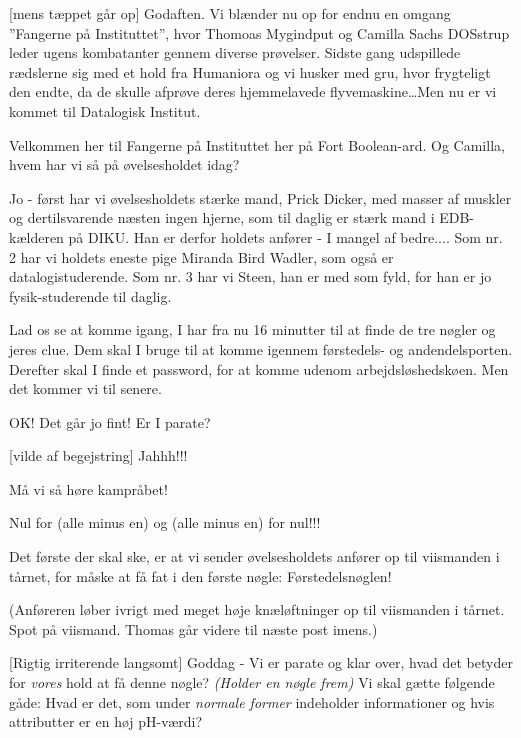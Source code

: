 \documentclass{article}
\begin{document}
\begin{sketch}

[mens tæppet går op] Godaften. Vi blænder nu op for endnu en
  omgang ''Fangerne på Instituttet'', hvor Thomoas Mygindput og Camilla
  Sachs DOSstrup leder ugens kombatanter gennem diverse prøvelser. Sidste
  gang udspillede rædslerne sig med et hold fra Humaniora og vi husker med
  gru, hvor frygteligt den endte, da de skulle afprøve deres hjemmelavede
  flyvemaskine\dots Men nu er vi kommet til Datalogisk Institut.

 Velkommen her til Fangerne på Instituttet her på Fort Boolean-ard. Og
Camilla, hvem har vi så på øvelsesholdet idag?

 Jo - først har vi øvelsesholdets stærke mand, Prick
Dicker, med masser af muskler og dertilsvarende næsten ingen hjerne, som
til daglig er stærk mand i EDB-kælderen på DIKU. Han er derfor holdets
anfører - I mangel af bedre.... Som nr. 2 har vi holdets eneste pige
Miranda Bird Wadler, som også er datalogistuderende. Som nr. 3 har vi
Steen, han er med som fyld, for han er jo fysik-studerende til daglig.

 Lad os se at komme igang, I har fra nu 16 minutter til at
finde de tre nøgler og jeres clue. Dem skal I bruge til at komme
igennem førstedels- og andendelsporten.  Derefter skal I finde et
password, for at komme udenom arbejdsløshedskøen.  Men det kommer vi til
senere.

 OK! Det går jo fint! Er I parate?

 [vilde af begejstring] Jahhh!!!

 Må vi så høre kampråbet!

 Nul for (alle minus en) og (alle minus en) for nul!!!

 Det første der skal ske, er at vi sender øvelsesholdets
anfører op til viismanden i tårnet, for måske at få fat i den første
nøgle: Førstedelsnøglen!

\scene (Anføreren løber ivrigt med meget høje knæløftninger op til
viismanden i tårnet. Spot på viismand. Thomas går videre til næste post
imens.)

 [Rigtig irriterende langsomt] Goddag - Vi er parate og klar
over, hvad det betyder for {\em vores\/} hold at få denne nøgle? {\em
(Holder en nøgle frem) \/} Vi skal gætte følgende gåde: Hvad er det, som
under {\em normale former} indeholder informationer og hvis attributter er en
høj pH-værdi?


\end{sketch}
\end{document}
